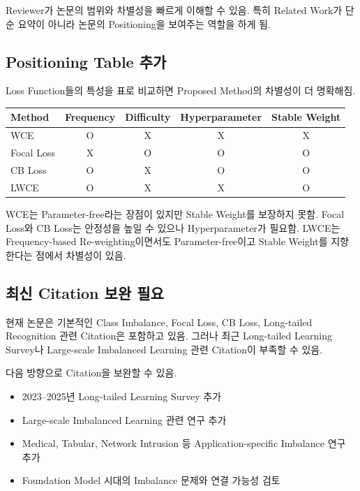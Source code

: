 \documentclass[11pt,a4paper]{article}
\begin{document}
\begin{tcolorbox}[title=효과]
Reviewer가 논문의 범위와 차별성을 빠르게 이해할 수 있음. 특히 Related Work가 단순 요약이 아니라 논문의 Positioning을 보여주는 역할을 하게 됨.
\end{tcolorbox}

\subsection{Positioning Table 추가}

Loss Function들의 특성을 표로 비교하면 Proposed Method의 차별성이 더 명확해짐.

\begin{center}
\begin{tabular}{lcccc}
\toprule
Method & Frequency & Difficulty & Hyperparameter & Stable Weight \\
\midrule
WCE & O & X & X & X \\
Focal Loss & X & O & O & O \\
CB Loss & O & X & O & O \\
LWCE & O & X & X & O \\
\bottomrule
\end{tabular}
\end{center}

\begin{tcolorbox}[title=해석]
WCE는 Parameter-free라는 장점이 있지만 Stable Weight를 보장하지 못함. Focal Loss와 CB Loss는 안정성을 높일 수 있으나 Hyperparameter가 필요함. LWCE는 Frequency-based Re-weighting이면서도 Parameter-free이고 Stable Weight를 지향한다는 점에서 차별성이 있음.
\end{tcolorbox}

\subsection{최신 Citation 보완 필요}

현재 논문은 기본적인 Class Imbalance, Focal Loss, CB Loss, Long-tailed Recognition 관련 Citation은 포함하고 있음. 그러나 최근 Long-tailed Learning Survey나 Large-scale Imbalanced Learning 관련 Citation이 부족할 수 있음.

다음 방향으로 Citation을 보완할 수 있음.

\begin{itemize}
\item 2023--2025년 Long-tailed Learning Survey 추가
\item Large-scale Imbalanced Learning 관련 연구 추가
\item Medical, Tabular, Network Intrusion 등 Application-specific Imbalance 연구 추가
\item Foundation Model 시대의 Imbalance 문제와 연결 가능성 검토
\end{itemize}
\end{document}
